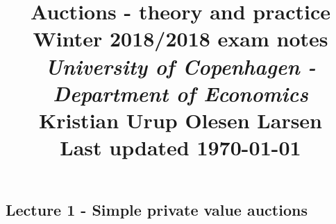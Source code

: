 \documentclass[12pt, a4paper]{article}
\theoremstyle{definition}
\begin{document}
\begin{spacing}{1.213}

\title{ Auctions - theory and practice  \\ \Large Winter 2018/2018 exam notes \\ \large \textit{University of Copenhagen - Department of Economics}  \\
\normalsize Kristian Urup Olesen Larsen \\
\normalsize Last updated \today  } %
\date{} %
\maketitle %
\setcounter{page}{1} %


\pagebreak

\tableofcontents
\newpage

\section{Lecture 1 - Simple private value auctions}


\end{spacing}
\end{document}
